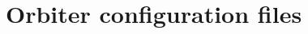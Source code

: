 \documentclass[Orbiter Developer Manual.tex]{subfiles}
\begin{document}
\section{Orbiter configuration files}

\end{document}
